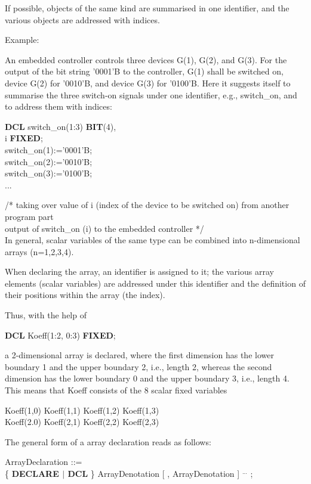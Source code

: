 \begin{tobedone}
If possible, objects of the same kind are summarised in
one identifier, and the various objects are addressed with indices.

Example:

An embedded controller controls three devices G(1), G(2), and G(3). For
the output of the bit string '0001'B to the controller, G(1) shall be
switched on, device G(2) for '0010'B, and device G(3) for '0100'B. Here it
suggests itself to summarise the three switch-on signals under one
identifier, e.g., switch\_on, and to address them with indices:

{\bf DCL} switch\_on(1:3) {\bf BIT}(4),\\
\x i {\bf FIXED};\\
switch\_on(1):='0001'B;\\
switch\_on(2):='0010'B;\\
switch\_on(3):='0100'B;\\
...

/* taking over value of i (index of the device to be switched on)
from another program part\\
output of switch\_on (i) to the embedded controller */\\

In general, scalar variables of the same type can be combined into
n-dimensional arrays (n=1,2,3,4).

When declaring the array, an identifier is assigned to it; the various
array elements (scalar variables) are addressed under this identifier
and the definition of their positions within the array (the index).

Thus, with the help of

{\bf DCL} Koeff(1:2, 0:3) {\bf FIXED};

a 2-dimensional array is declared, where the first dimension has the
lower boundary 1 and the upper boundary 2, i.e., length 2, whereas the
second dimension has the lower boundary 0 and the upper boundary 3,
i.e., length 4.  This means that Koeff consists of the 8 scalar fixed
variables

Koeff(1,0) \x  Koeff(1,1) \x  Koeff(1,2) \x  Koeff(1,3) \\
Koeff(2.0) \x  Koeff(2,1) \x  Koeff(2,2) \x  Koeff(2,3)

The general form of a array declaration reads as follows:

ArrayDeclaration ::=\\
\x \{ {\bf DECLARE $\mid$ DCL} \} ArrayDenotation [ , ArrayDenotation ] $^{...}$ ;


\end{tobedone}
